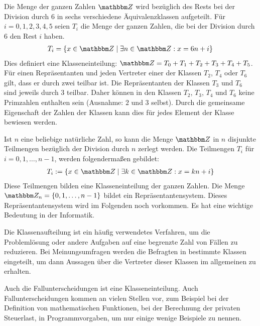 \begin{Unit}[Beispiel]
  Die Menge der ganzen Zahlen $\ZZ$ wird bezüglich des Rests bei der Division 
  durch $6$ in sechs verschiedene Äquivalenzklassen aufgeteilt. Für 
  $i = 0, 1, 2, 3, 4, 5$ seien $T_i$ die Menge der ganzen Zahlen, die bei der
  Division durch $6$ den Rest $i$ haben. 
  \begin{align}
    T_i = \{x \in \ZZ \mid \exists n \in \ZZ : x = 6n + i \}
  \end{align}
  Dies definiert eine Klasseneinteilung: $\ZZ = T_0 + T_1 + T_2 + T_3 + T_4 + 
    T_5$. \\
  Für einen Repräsentanten und jeden Vertreter einer der Klassen $T_2$, $T_4$ 
  oder $T_6$ gilt, dass er durch zwei teilbar ist. Die Repräsentanten der 
  Klassen $T_3$ und $T_6$ sind jeweils durch 3 teilbar. Daher können in den 
  Klassen $T_2$, $T_3$, $T_4$ und $T_6$ keine Primzahlen enthalten sein 
  (Ausnahme: $2$ und $3$ selbst). Durch die gemeinsame Eigenschaft der Zahlen 
  der Klassen kann dies für jedes Element der Klasse bewiesen werden.
\end{Unit}

\begin{Unit}[Anmerkung]
Ist $n$ eine beliebige natürliche Zahl, so kann die Menge $\ZZ$ in $n$ 
disjunkte Teilmengen bezüglich der Division durch $n$ zerlegt werden. Die 
Teilmengen $T_i$ für $i = 0, 1, \ldots, n-1$, werden folgendermaßen gebildet: 
\begin{align}
  T_i := \{ x \in \ZZ \mid \exists k \in \ZZ: x = kn+i \}
\end{align}
Diese Teilmengen bilden eine Klasseneinteilung der ganzen Zahlen. Die Menge 
$\ZZ_n = \{0, 1, \ldots, n-1\}$ bildet ein Repräsentantensystem. Dieses 
Repräsentantensystem wird im Folgenden noch vorkommen. Es hat eine wichtige
Bedeutung in der Informatik.
\end{Unit}

\begin{Unit}[Anmerkung]
Die Klassenaufteilung ist ein häufig verwendetes Verfahren, um die 
Problemlösung oder andere Aufgaben auf eine begrenzte Zahl von Fällen zu 
reduzieren. Bei Meinungsumfragen werden die Befragten in bestimmte Klassen
eingeteilt, um dann Aussagen über die Vertreter dieser Klassen im allgemeinen 
zu erhalten.

Auch die Fallunterscheidungen ist eine Klasseneinteilung. Auch 
Fallunterscheidungen kommen an vielen Stellen vor, zum Beispiel bei der 
Definition von mathematischen Funktionen, bei der Berechnung der privaten 
Steuerlast, in Programmvorgaben, um nur einige wenige Beispiele  zu nennen.
\end{Unit}

